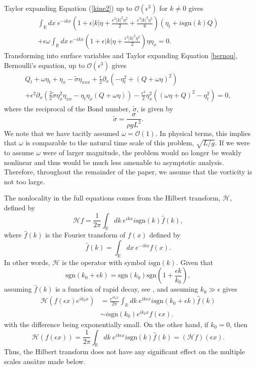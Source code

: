 \documentclass{JFM_Style/jfm}
\newcommand{\pd}{\partial}
\begin{document}
Taylor expanding Equation (\ref{kine2}) up to $\mathcal{O}(\epsilon^3)$ for $k\neq 0$ gives
\begin{multline}
\int_{\mathbb{R}}dx~e^{-ikx}\left(1 + \epsilon |k|\eta + \frac{\epsilon^{2}|k|^{2}\eta^{2}}{2} + \frac{\epsilon^{3}|k|^{3}\eta^{3}}{6}\right)\left(\eta_{t} + i \mbox{sgn}(k)Q \right) \\
+ \epsilon \omega \int_{\mathbb{R}}dx~e^{-ikx}\left(1 + \epsilon |k|\eta + \frac{\epsilon^{2}|k|^{2}\eta^{2}}{2}\right) \eta \eta_{x} = 0.
\label{integro1}
\end{multline}
Transforming into surface variables and Taylor expanding Equation \eqref{bernou}, Bernoulli's equation, up to $\mathcal{O}(\epsilon^3)$ gives
\begin{multline}
Q_{t} + \omega \eta_{t} + \eta_{x} - \tilde{\sigma}\eta_{xxx} + \frac{\epsilon}{2}\pd_{x}\left(-\eta_{t}^{2} + (Q+\omega \eta)^{2} \right)\\
+ \epsilon^{2}\pd_{x}\left( \frac{3}{2}\tilde{\sigma}\eta_{x}^{2}\eta_{xx} - \eta_{t}\eta_{x} \left(Q  + \omega \eta \right) \right) - \frac{\epsilon^{3}}{2}\eta_{x}^{2}\left((\omega\eta+Q)^{2}-\eta_{t}^{2}\right) = 0,
\label{berexp}
\end{multline}
where the reciprocal of the Bond number, $\tilde{\sigma}$, is given by
\[
\tilde{\sigma} = \frac{\sigma}{\rho g L^2}.
\]
We note that we have tacitly assumed $\omega = \mathcal{O}(1)$.  In physical terms, this implies that $\omega$ is comparable to the natural time scale of this problem, $\sqrt{L/g}$.  If we were to assume $\omega$ were of larger magnitude, the problem would no longer be weakly nonlinear and thus would be much less amenable to asymptotic analysis.  Therefore, throughout the remainder of the paper, we assume that the vorticity is not too large.

The nonlocality in the full equations comes from the Hilbert transform, $\mathcal{H}$, defined by
\[
\mathcal{H}f = \frac{1}{2\pi}\int_{\mathbb{R}}dk~ e^{ikx}  i\mbox{sgn}(k) \hat{f}(k),
\]
where $\hat{f}(k)$ is the Fourier transform of $f(x)$ defined by
\[
\hat{f}(k) = \int_{\mathbb{R}}dx~ e^{-ikx}f(x).
\]
In other words, $\mathcal{H}$ is the operator with symbol $i\mbox{sgn}(k)$.  Given that
\[
\mbox{sgn}(k_{0} + \epsilon k) = \mbox{sgn}(k_{0})\mbox{sgn}\left( 1 + \frac{\epsilon k}{k_{0}}\right),
\]
assuming $\hat{f}(k)$ is a function of rapid decay, see \cite{folland},  and assuming $k_{0}\gg \epsilon$ gives
\begin{align}
\mathcal{H}\left( f(\epsilon x) e^{ik_{0}x} \right)& =
\frac{e^{ik_{0}x}}{2\pi}\int_{\mathbb{R}}dk~ e^{ik\epsilon x}
i\mbox{sgn}(k_{0}+\epsilon k) \hat{f}(k)\nonumber \\ & \sim i\mbox{sgn}(k_{0})e^{ik_{0}x}f(\epsilon x).\nonumber
\end{align}
with the difference being exponentially small.  On the other hand, if $k_{0}=0$, then
\[
\mathcal{H}\left( f(\epsilon x) \right) = \frac{1}{2\pi}\int_{\mathbb{R}}dk~ e^{ik\epsilon x}  i\mbox{sgn}(k) \hat{f}(k) = (\mathcal{H}f)(\epsilon x).
\]
Thus, the Hilbert transform does not have any significant effect on the multiple scales ans\"{a}tze made below.
\end{document}
